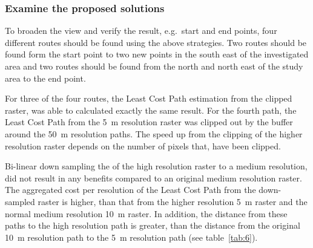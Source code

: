 
\subsubsection{Examine the proposed solutions}
To broaden the view and verify the result, e.g.\ start and end points, four different routes should be found using the above strategies.
Two routes should be found form the start point to two new points in the south east of the investigated area and two routes should be found from the north and north east of the study area to the end point.

For three of the four routes, the Least Cost Path estimation from the clipped raster, was able to calculated exactly the same result.
For the fourth path, the Least Cost Path from the 5~m resolution raster was clipped out by the buffer around the 50~m resolution paths.
The speed up from the clipping of the higher resolution raster depends on the number of pixels that, have been clipped. 

Bi-linear down sampling the of the high resolution raster to a medium resolution, did not result in any benefits compared to an original medium resolution raster.
The aggregated cost per resolution of the Least Cost Path from the down-sampled raster is higher, than that from the higher resolution 5~m raster and the normal medium resolution 10~m raster.
In addition, the distance from these paths to the high resolution path  is greater, than the distance from the original 10~m resolution path to the 5~m resolution path (see table~\ref{tab:6}).

